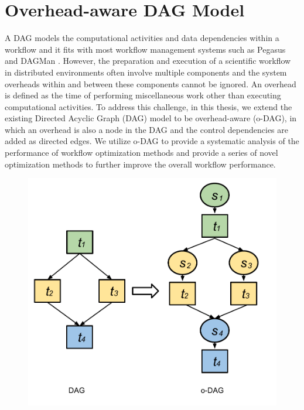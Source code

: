 \section{Overhead-aware DAG Model}

A DAG models the computational activities and data dependencies within a workflow and it fits with most workflow management systems such as Pegasus \cite{Deelman2004} and DAGMan \cite{Kalayci2010}. However, the preparation and execution of a scientific workflow in distributed environments often involve multiple components and the system overheads within and between these components cannot be ignored. 
An overhead is defined as the time of performing miscellaneous work other than executing computational activities. 
To address this challenge, in this thesis, we extend the existing Directed Acyclic Graph (DAG) model to be overhead-aware (o-DAG), in which an overhead is also a node in the DAG and the control dependencies are added as directed edges. We utilize o-DAG to provide a systematic analysis of the performance of workflow optimization methods and provide a series of novel optimization methods to further improve the overall workflow performance. 





\begin{figure}[h!]
\includegraphics[width=0.6\linewidth]{figures/model/odag.pdf}
\centering
  \label{fig:model_odag}
\end{figure}

